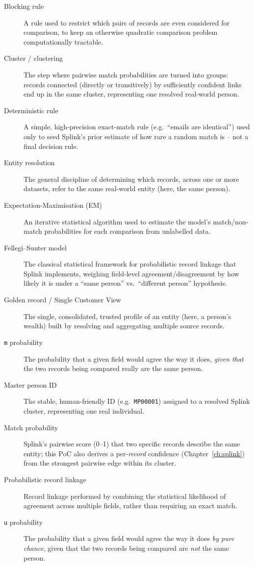\documentclass[11pt]{report}
\begin{document}
\begin{description}
\item[Blocking rule] A rule used to restrict which pairs of records are even considered for comparison, to keep an otherwise quadratic comparison problem computationally tractable.
\item[Cluster / clustering] The step where pairwise match probabilities are turned into groups: records connected (directly or transitively) by sufficiently confident links end up in the same cluster, representing one resolved real-world person.
\item[Deterministic rule] A simple, high-precision exact-match rule (e.g.\ ``emails are identical'') used only to seed Splink's prior estimate of how rare a random match is -- not a final decision rule.
\item[Entity resolution] The general discipline of determining which records, across one or more datasets, refer to the same real-world entity (here, the same person).
\item[Expectation-Maximisation (EM)] An iterative statistical algorithm used to estimate the model's match/non-match probabilities for each comparison from unlabelled data.
\item[Fellegi--Sunter model] The classical statistical framework for probabilistic record linkage that Splink implements, weighing field-level agreement/disagreement by how likely it is under a ``same person'' vs.\ ``different person'' hypothesis.
\item[Golden record / Single Customer View] The single, consolidated, trusted profile of an entity (here, a person's wealth) built by resolving and aggregating multiple source records.
\item[\texttt{m} probability] The probability that a given field would agree the way it does, \emph{given that} the two records being compared really are the same person.
\item[Master person ID] The stable, human-friendly ID (e.g.\ \texttt{MP00001}) assigned to a resolved Splink cluster, representing one real individual.
\item[Match probability] Splink's pairwise score (0--1) that two specific records describe the same entity; this PoC also derives a per-\emph{record} confidence (Chapter~\ref{ch:splink}) from the strongest pairwise edge within its cluster.
\item[Probabilistic record linkage] Record linkage performed by combining the statistical likelihood of agreement across multiple fields, rather than requiring an exact match.
\item[\texttt{u} probability] The probability that a given field would agree the way it does \emph{by pure chance}, given that the two records being compared are \emph{not} the same person.
\end{description}
\end{document}
